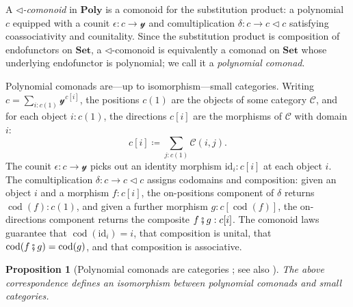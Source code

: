 \documentclass[11pt, oneside, article]{memoir}
\theoremstyle{definition}
\theoremstyle{plain}
\newtheorem{proposition}[proposition]{Proposition}
\DeclareMathOperator{\cod}{cod}
\newcommand{\cat}[1]{\mathcal{#1}}%
\newcommand{\Cat}[1]{\mathbf{#1}}%
\newcommand{\id}{\mathrm{id}}
\newcommand{\then}{\mathbin{\fatsemi}}
\newcommand{\smset}{\Cat{Set}}
\newcommand{\yon}{\mathcal{y}}
\newcommand{\poly}{\Cat{Poly}}
\newcommand{\tri}{\mathbin{\triangleleft}}
\begin{document}
A \emph{$\tri$-comonoid} in $\poly$ is a comonoid for the substitution product: a polynomial $c$ equipped with a counit $\epsilon\colon c\to\yon$ and comultiplication $\delta\colon c\to c\tri c$ satisfying coassociativity and counitality. Since the substitution product is composition of endofunctors on $\smset$, a $\tri$-comonoid is equivalently a comonad on $\smset$ whose underlying endofunctor is polynomial; we call it a \emph{polynomial comonad}.

Polynomial comonads are---up to isomorphism---small categories. Writing $c=\sum_{i:c(1)}\yon^{c[i]}$, the positions $c(1)$ are the objects of some category $\cat{C}$, and for each object $i:c(1)$, the directions $c[i]$ are the morphisms of $\cat{C}$ with domain $i$:
\[
c[i]\coloneqq\sum_{j:c(1)}\cat{C}(i,j).
\]
The counit $\epsilon\colon c\to\yon$ picks out an identity morphism $\id_i:c[i]$ at each object $i$. The comultiplication $\delta\colon c\to c\tri c$ assigns codomains and composition: given an object $i$ and a morphism $f:c[i]$, the on-positions component of $\delta$ returns $\cod(f):c(1)$, and given a further morphism $g:c[\cod(f)]$, the on-directions component returns the composite $f\then g:c[i]$. The comonoid laws guarantee that $\cod(\id_i)=i$, that composition is unital, that $\cod(f\then g)=\cod(g)$, and that composition is associative.

\begin{proposition}[Polynomial comonads are categories {\cite{ahman2016directed}; see also \cite{niu2025polynomial}}]\label{prop.comonads_cats}
The above correspondence defines an isomorphism between polynomial comonads and small categories.
\end{proposition}
\end{document}
